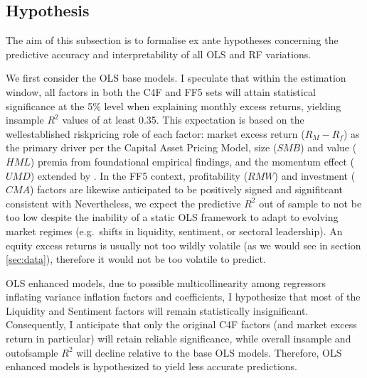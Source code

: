 
\subsection{Hypothesis}

The aim of this subsection is to formalise ex ante hypotheses concerning the predictive accuracy and interpretability of all OLS and RF variations. 

We first consider the OLS base models. I speculate that within the estimation window, all factors in both the C4F and FF5 sets will attain statistical significance at the 5\% level when explaining monthly excess returns, yielding in\-sample $R^{2}$ values of at least 0.35.  This expectation is based on the well\-established risk\-pricing role of each factor: market excess return ($R_{M}-R_{f}$) as the primary driver per the Capital Asset Pricing Model, size ($SMB$) and value ($HML$) premia from  foundational empirical findings, and the momentum effect ($UMD$) extended by . In the FF5 context, profitability ($RMW$) and investment ($CMA$) factors are likewise anticipated to be positively signed and signifitcant consistent with  Nevertheless, we expect the predictive $R^{2}$ out of sample to not be too low despite the inability of a static OLS framework to adapt to evolving market regimes (e.g.\ shifts in liquidity, sentiment, or sectoral leadership). An equity excess returns is usually not too wildly volatile (as we would see in section \ref{sec:data}), therefore it would not be too volatile to predict. %


OLS enhanced models, due to possible multicollinearity among regressors inflating variance inflation factors and coefficients, I hypothesize that most of the Liquidity and Sentiment factors will remain statistically insignificant.  Consequently, I anticipate that only the original C4F factors (and market excess return in particular) will retain reliable significance, while overall in\-sample and out\-of\-sample $R^{2}$ will decline relative to the base OLS models. Therefore, OLS enhanced models is hypothesized to yield less accurate predictions.

